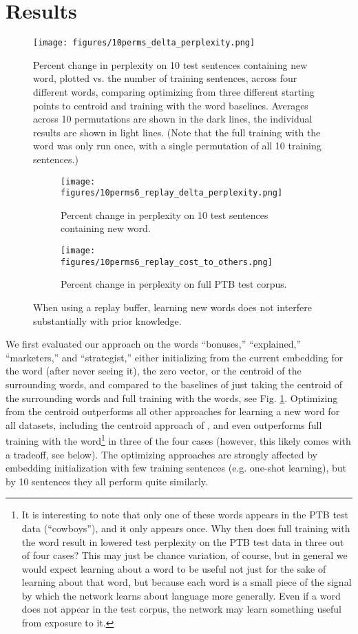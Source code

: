 \documentclass{article}
\begin{document}
\section{Results}
\begin{figure}
\centering
\texttt{[image: figures/10perms\_delta\_perplexity.png]}
\caption{Percent change in perplexity on 10 test sentences containing new word, plotted vs. the number of training sentences, across four different words, comparing optimizing from three different starting points to centroid and training with the word baselines. Averages across 10 permutations are shown in the dark lines, the individual results are shown in light lines. (Note that the full training with the word was only run once, with a single permutation of all 10 training sentences.)}
\label{main_results_1}
\end{figure}
\begin{figure}
\centering
\begin{subfigure}[b]{\textwidth}
\texttt{[image: figures/10perms6\_replay\_delta\_perplexity.png]}
\caption{Percent change in perplexity on 10 test sentences containing new word.}
\end{subfigure}
\begin{subfigure}[b]{\textwidth}
\texttt{[image: figures/10perms6\_replay\_cost\_to\_others.png]}
\caption{Percent change in perplexity on full PTB test corpus.}
\end{subfigure}
\caption{When using a replay buffer, learning new words does not interfere substantially with prior knowledge.}
\label{ameliorating_interference_fig}
\end{figure}
We first evaluated our approach on the words ``bonuses,'' ``explained,'' ``marketers,'' and ``strategist,'' either initializing from the current embedding for the word (after never seeing it), the zero vector, or the centroid of the surrounding words, and compared to the baselines of just taking the centroid of the surrounding words and full training with the words, see Fig. \ref{main_results_1}. Optimizing from the centroid outperforms all other approaches for learning a new word for all datasets, including the centroid approach of \citet{Lazaridou2017}, and even outperforms full training with the word\footnote{It is interesting to note that only one of these words appears in the PTB test data (``cowboys''), and it only appears once. Why then does full training with the word result in lowered test perplexity on the PTB test data in three out of four cases? This may just be chance variation, of course, but in general we would expect learning about a word to be useful not just for the sake of learning about that word, but because each word is a small piece of the signal by which the network learns about language more generally. Even if a word does not appear in the test corpus, the network may learn something useful from exposure to it.} in three of the four cases (however, this likely comes with a tradeoff, see below). The optimizing approaches are strongly affected by embedding initialization with few training sentences (e.g. one-shot learning), but by 10 sentences they all perform quite similarly. \par
\end{document}
